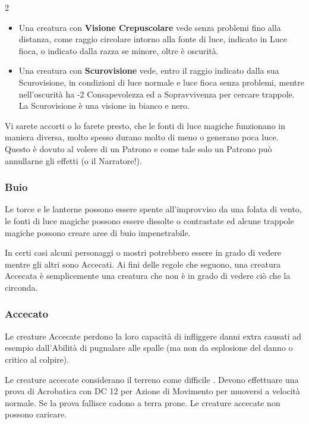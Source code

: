 \begin{multicols}{2}
\begin{itemize}[leftmargin=*]
\item
Una creatura con \textbf{Visione Crepuscolare} vede senza problemi fino alla distanza, come raggio circolare intorno alla fonte di luce, indicato in Luce fioca, o indicato dalla razza se minore, oltre è oscurità.

\item
Una creatura con \textbf{Scurovisione}  vede, entro il raggio indicato dalla sua Scurovisione, in condizioni di luce normale e luce fioca senza problemi, mentre nell'oscurità ha -2 Consapevolezza ed a Sopravvivenza per cercare trappole. La Scurovisione è una visione in bianco e nero.
\end{itemize}

\begin{giocatore}
Vi sarete accorti o lo farete presto, che le fonti di luce magiche funzionano in maniera diversa, molto spesso durano molto di meno o generano poca luce. Questo è dovuto al volere di un Patrono e come tale solo un Patrono può annullarne gli effetti (o il Narratore!).
\end{giocatore}

\subsubsection{Buio}

\label{buio}

Le torce e le lanterne possono essere spente all'improvviso da una folata di vento, le fonti di luce magiche possono essere dissolte o contrastate ed alcune trappole magiche possono creare aree di buio impenetrabile.

In certi casi alcuni personaggi o mostri potrebbero essere in grado di vedere mentre gli altri sono Accecati. Ai fini delle regole che seguono, una creatura Accecata è semplicemente una creatura che non è in grado di vedere ciò che la circonda.

\subsubsection{Accecato}

\label{accecato}

Le creature Accecate perdono la loro capacità di infliggere danni extra causati ad esempio dall'Abilità di pugnalare alle spalle (ma non da esplosione del danno o critico al colpire).

Le creature accecate considerano il terreno come difficile . Devono effettuare una prova di Acrobatica con DC 12 per Azione di Movimento per muoversi a velocità normale. Se la prova fallisce cadono a terra prone. Le creature accecate non possono caricare.


\end{multicols}
